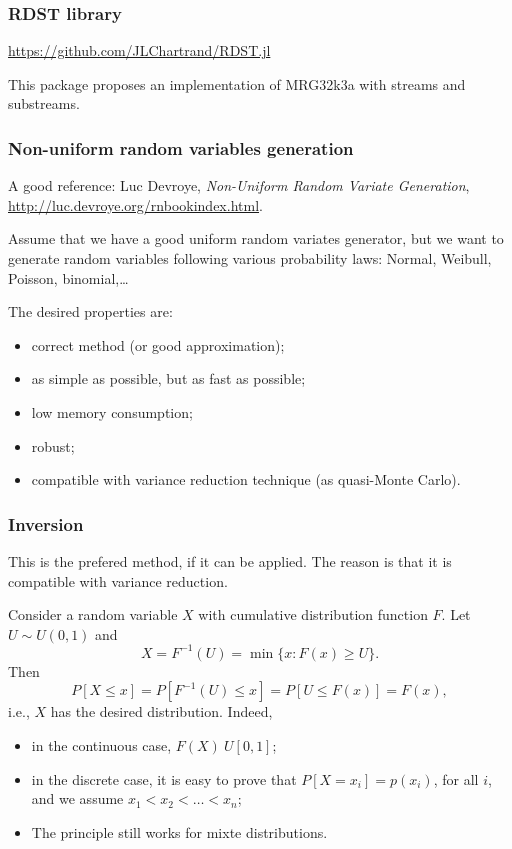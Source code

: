 \documentclass{beamer}
\begin{document}
		\begin{frame}[containsverbatim]
	\frametitle{RDST library}
	
	\url{https://github.com/JLChartrand/RDST.jl}		
	
	\mbox{}
	
	This package proposes an implementation of MRG32k3a with streams and substreams.
	
\end{frame}

	\begin{frame}
		\frametitle{Non-uniform random variables generation}
		\label{chap:nonuniform}
		
		A good reference: Luc Devroye, \textsl{Non-Uniform
			Random Variate Generation},
		\url{http://luc.devroye.org/rnbookindex.html}.
		
		\mbox{}
		
		Assume that we have a good uniform random variates generator, but we
		want to generate random variables following various probability laws:
		Normal, Weibull, Poisson, binomial,\ldots
		
		\mbox{}
		
		The desired properties are:
		\begin{itemize}
			\item
			correct method (or good approximation);
			\item
			as simple as possible, but as fast as possible;
			\item
			low memory consumption;
			\item
			robust;
			\item
			compatible with variance reduction technique (as quasi-Monte Carlo).
		\end{itemize}
		
	\end{frame}
	
	\begin{frame}
		\frametitle{Inversion}
		
		This is the prefered method, if it can be applied. The reason is that
		it is compatible with variance reduction.
		
		\mbox{}
		
		Consider a random variable $X$ with cumulative distribution function $F$.
		Let $U \sim U (0, 1)$ and
		\[
		X = F^{-1}(U) = \min \lbrace x : F (x)  \geq U \rbrace.
		\]
		Then
		\[
		P [X \leq x] = P [F^{-1}(U) \leq x] = P [U \leq F (x)] = F (x),
		\]
		i.e., $X$ has the desired distribution.
		Indeed,
		\begin{itemize}
			\item
			in the continuous case, $F(X) ~ U[0,1]$;
			\item
			in the discrete case, it is easy to prove that $P[X = x_i] = p(x_i)$,
			for all $i$, and we assume $x_1 < x_2 < \ldots < x_n$;
			\item
			The principle still works for mixte distributions.
		\end{itemize}
		
	\end{frame}
	
\end{document}
